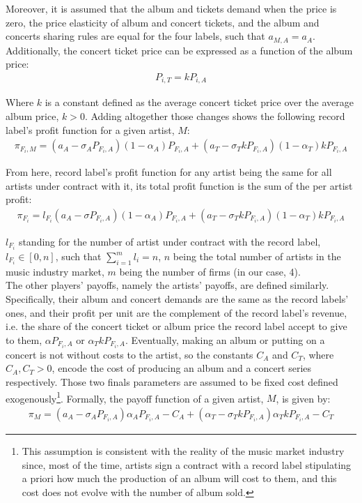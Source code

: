 \documentclass[a4paper,12pt]{article}
\numberwithin{equation}{section}
\begin{document}
Moreover, it is assumed that the album and tickets demand when the price is zero, the price elasticity of album and concert tickets, and the album and concerts sharing rules are equal for the four labels, such that $a_{M, A} = a_A$. Additionally, the concert ticket price can be expressed as a function of the album price:
\begin{eqnarray*}
P_{i, T} = k P_{i, A}
\end{eqnarray*}

Where $k$ is a constant defined as the average concert ticket price over the average album price, $k > 0$. Adding altogether those changes shows the following record label’s profit function for a given artist, $M$:
\begin{eqnarray}
\pi_{F_i, M} = (a_A - \sigma_A P_{F_i, A})(1 - \alpha_A) P_{F_i, A} +
	(a_T - \sigma_T k P_{F_i, A}) (1 - \alpha_T) k P_{F_i, A}
\end{eqnarray}

From here, record label’s profit function for any artist being the same for all artists under contract with it, its total profit function is the sum of the per artist profit:
\begin{eqnarray}
\pi_{F_i} = l_{F_i} (a_A - \sigma P_{F_i, A})(1 - \alpha_A) P_{F_i, A} +
	(a_T - \sigma_T k P_{F_i, A})(1 - \alpha_T) k P_{F_i, A}
\end{eqnarray}

$l_{F_i}$ standing for the number of artist under contract with the record label, $l_{F_i} \in [0, n]$, such that $\sum_{i = 1}^m l_i = n$, $n$ being the total number of artists in the music industry market, $m$ being the number of firms (in our case, 4).\\

The other players’ payoffs, namely the artists’ payoffs, are defined similarly. Specifically, their album and concert demands are the same as the record labels’ ones, and their profit per unit are the complement of the record label’s revenue, i.e. the share of the concert ticket or album price the record label accept to give to them, $\alpha P_{F_i, A}$ or $\alpha_T k P_{F_i, A}$. Eventually, making an album or putting on a concert is not without costs to the artist, so the constants $C_A$ and $C_T$, where $C_A, C_T > 0$,  encode the cost of producing an album and a concert series respectively. Those two finals parameters are assumed to be fixed cost defined exogenously\footnote{
This assumption is consistent with the reality of the music market industry since, most of the time, artists sign a contract with a record label stipulating a priori how much the production of an album will cost to them, and this cost does not evolve with the number of album sold.
}. Formally, the payoff function of a given artist, $M$, is given by:
\begin{eqnarray}
\pi_M = (a_A - \sigma_A P_{F_i, A})\alpha_A P_{F_i, A} - C_A
	+ (\alpha_T - \sigma_T k P_{F_i, A}) \alpha_T k P_{F_i, A} - C_T
\end{eqnarray}
\end{document}
